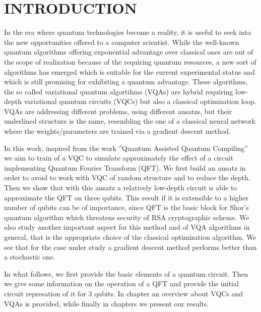\documentclass[inscr,ack,preface]{diphdthesis}
\begin{document}
\frontmatter


\mainmatter

\chapter{INTRODUCTION}

In the era where quantum technologies become a reality, it is useful to seek into the 
new opportunities offered to a computer scientist. While the well-known quantum algorithms
offering exponential advantage over classical ones are out of the scope of realization because of
the requiring  quantum resources, a new sort of algorithms  has emerged
which is suitable for the current experimental status and which is still promising for exhibiting a quantum advantage.
These algorithms,  the so called variational quantum algortihms (VQAs) are hybrid requiring low-depth variational  quantum circuits (VQCs) but also a classical optimization loop. VQAs are addressing different problems, using different ansatzs, but their underlined structure
is the same, resembling the one of a classical neural network where the weights/parameters are trained via a gradient descent method. 

In this work, inspired from the work ''Quantum Assisted Quantum Compiling'' we aim to train of a VQC to simulate approximately 
the effect of a circuit implementing Quantum Fourier Transform (QFT). We first build an ansatz in order to avoid to work with VQC of random structure and to  reduce the depth. Then we show that with this ansatz a relatively low-depth circuit is able to approximate the QFT on three qubits. This result if it is extensible to a higher number of qubits can be of importance, since QFT is the basic block for Shor's quantum algorithm which threatens security of RSA cryptographic scheme.
We also study another important aspect for this method and of VQA algorithms in general, that is the appropriate choice
of the classical optimization algorithm. We see that for the case under study a gradient descent method performs better
than a stochastic one.
 
 In what follows, we first provide the basic elements of a quantum circuit. Then we give some information on
the operation of a QFT and provide the initial circuit represation of it for $3$ qubits. In chapter an overview about
VQCs and VQAs is provided, while finally in chapters we present our results.
\end{document}
